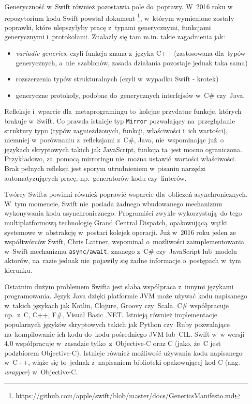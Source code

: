 \documentclass[mgr, shortabstract]{iithesis}
\newcommand{\ang}[1]{ang. \textit{#1}}
\newcommand{\swiftinline}[1]{
    \texttt{#1}
}
\begin{document}
Generyczność w~Swift również pozostawia pole do~poprawy. W~2016 roku w repozytorium kodu Swift powstał dokument \footnote{https://github.com/apple/swift/blob/master/docs/GenericsManifesto.md}, w~którym wymienione zostały poprawki, które ulepszyłyby pracę z~typami generycznymi, funkcjami generycznymi i~protokołami. Znalazły się tam m.in. takie zagadnienia jak:
\begin{itemize}
    \item \textit{variadic generics}, czyli funkcja znana z~języka C++ (zastosowana dla~typów generycznych, a~nie~szablonów, zasada działania pozostaje jednak taka sama)
    \item rozszerzenia typów strukturalnych (czyli w~wypadku Swift - krotek)
    \item generyczne protokoły, podobne do~generycznych interfejsów w~C\# czy~Java.
\end{itemize}

Refleksje i~wparcie dla~metaprogramingu to~kolejne przydatne funkcje, których brakuje w~Swift. Co prawda istnieje typ \swiftinline{Mirror} pozwalający na~przeglądanie struktury typu (typów zagnieżdżonych, funkcji, właściwości i~ich wartości), niemniej w~porównaniu z~refleksjami z~C\#, Java, nie~wspominając już o językach skryptowych takich jak JavaScript, funkcja ta~jest mocno ograniczona. Przykładowo, za~pomocą mirroringu nie~można ustawić wartości właściwości. Brak pełnych refleksji jest sporym utrudnieniem w~pisaniu narzędzi automatyzujących pracę, np.~generatorów kodu czy~linterów.

Twórcy Swifta powinni również poprawić wsparcie dla~obliczeń asynchronicznych. W~tym momencie, Swift nie~posiada żadnego wbudowanego mechanizmu wykonywania kodu asynchronicznego. Programiści zwykle wykorzystują do tego multiplatformową technologię Grand Central Dispatch, opakowującą wątki systemowe w~abstrakcję w~postaci kolejek operacji. Już w~2016 roku jeden ze współtwórców Swift, Chris Lattner, wspominał o~możliwości zaimplementowania w~Swift mechanizmu \texttt{async/await}, znanego z~C\# czy~JavaScript lub~modelu aktorów, na~razie jednak nie~pojawiły się żadne informacje o~postępach w~tym kierunku.

Ostatnim dużym problemem Swifta jest słaba współpraca z~innymi językami programowania. Język Java dzięki platformie JVM może używać kodu napisanego w~takich językach jak Kotlin, Clojure, Groovy czy~Scala. C\# współpracuje np.~z~C, C++, F\#, Visual Basic .NET. Istnieją również implementacje popularnych języków skryptowych takich jak Python czy~Ruby pozwalające na~kompilowanie ich kodu do~kodu pośredniego JVM lub~CIL. Swift w~w wersji 4.0 współpracuje w~zasadzie tylko~z~Objective-C oraz C (jako, że~C jest podzbiorem Objective-C). Istnieje również możliwość używania kodu napisanego w~C++, wiąże się to~jednak z~napisaniem biblioteki opakowującej kod C (\ang{wrapper}) w~Objective-C.
\end{document}
